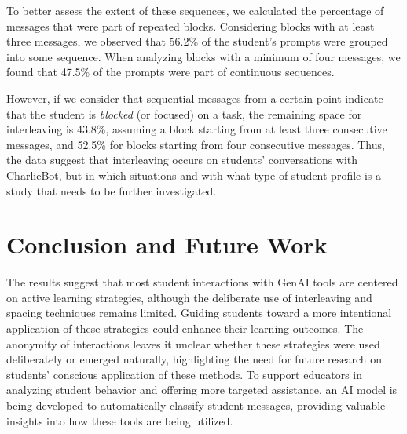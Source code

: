 \documentclass[a4paper,twoside]{article}
\begin{document}
To better assess the extent of these sequences, we calculated the percentage of
messages that were part of repeated blocks. Considering blocks with at least
three messages, we observed that 56.2\% of the student's prompts were grouped
into some sequence. When analyzing blocks with a minimum of four messages, we
found that 47.5\% of the prompts were part of continuous sequences.

However, if we consider that sequential messages from a certain point indicate
that the student is \textit{blocked} (or focused) on a task, the remaining space
for interleaving is 43.8\%, assuming a block starting from at least three
consecutive messages, and 52.5\% for blocks starting from four consecutive
messages. Thus, the data suggest that interleaving occurs on students'
conversations with CharlieBot, but in which situations and with what type of
student profile is a study that needs to be further investigated.

\section{Conclusion and Future Work}

The results suggest that most student interactions with GenAI tools are centered
on active learning strategies, although the deliberate use of interleaving and
spacing techniques remains limited. Guiding students toward a more intentional
application of these strategies could enhance their learning outcomes. The
anonymity of interactions leaves it unclear whether these strategies were used
deliberately or emerged naturally, highlighting the need for future research on
students' conscious application of these methods. To support educators in
analyzing student behavior and offering more targeted assistance, an AI model
is being developed to automatically classify student messages, providing
valuable insights into how these tools are being utilized.




\end{document}
